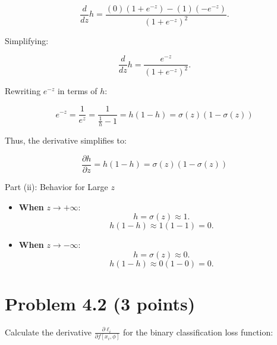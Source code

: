 \documentclass[10pt]{article}
\begin{document}
\begin{equation}
    \frac{d}{dz} h = \frac{(0)(1+e^{-z}) - (1)(-e^{-z})}{(1+e^{-z})^2}.
\end{equation}

Simplifying:

\begin{equation}
    \frac{d}{dz} h = \frac{e^{-z}}{(1+e^{-z})^2}.
\end{equation}

Rewriting $e^{-z}$ in terms of $h$:

\begin{equation}
    e^{-z} = \frac{1}{e^z} = \frac{1}{\frac{1}{h} - 1} = h(1 - h) =  \sigma(z) (1 -  \sigma(z))
\end{equation}

Thus, the derivative simplifies to:

\begin{equation}
    \frac{\partial h}{\partial z} = h(1 - h) =  \sigma(z) (1 -  \sigma(z))
\end{equation}


\noindent  Part (ii): Behavior for Large $z$

\begin{itemize}
    \item \textbf{When} $z \to +\infty$:
    \begin{equation}
        h = \sigma(z) \approx 1.
    \end{equation}
    \begin{equation}
        h(1 - h) \approx 1(1 - 1) = 0.
    \end{equation}
    
    \item \textbf{When} $z \to -\infty$:
    \begin{equation}
        h = \sigma(z) \approx 0.
    \end{equation}
    \begin{equation}
        h(1 - h) \approx 0(1 - 0) = 0.
    \end{equation}
\end{itemize}


\newpage



\section*{Problem 4.2 (3 points)}

Calculate the derivative \( \frac{\partial \ell_i}{\partial f[x_i, \phi]} \) for the binary 
classification loss function:
\end{document}
